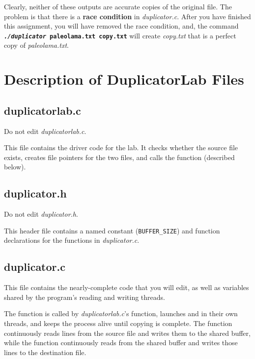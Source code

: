     Clearly, neither of these outputs are accurate copies of the original file.
    The problem is that there is a \textbf{race condition} in \textit{duplicator.c}.
    After you have finished this assignment, you will have removed the race condition, and, the command \texttt{\textbf{\textit{./duplicator}~paleolama.txt~copy.txt}} will create \textit{copy.txt} that is a perfect copy of \textit{paleolama.txt}.

    \section{Description of DuplicatorLab Files}

    \subsection{duplicatorlab.c}

    Do not edit \textit{duplicatorlab.c}.

    This file contains the driver code for the lab.
    It checks whether the source file exists, creates file pointers for the two files, and calls the  function (described below).


    \subsection{duplicator.h}\label{subsec:duplicator.h}

    Do not edit \textit{duplicator.h}.

    This header file contains a named constant (\lstinline{BUFFER_SIZE}) and function declarations for the functions in \textit{duplicator.c}.


    \subsection{duplicator.c}\label{subsec:duplicator.c}

    This file contains the nearly-complete code that you will edit, as well as variables shared by the program's reading and writing threads.

    The  function is called by \textit{duplicatorlab.c}'s  function, launches  and  in their own threads, and keeps the process alive until copying is complete.
    The  function continuously reads lines from the source file and writes them to the shared buffer, while the  function continuously reads from the shared buffer and writes those lines to the destination file.

